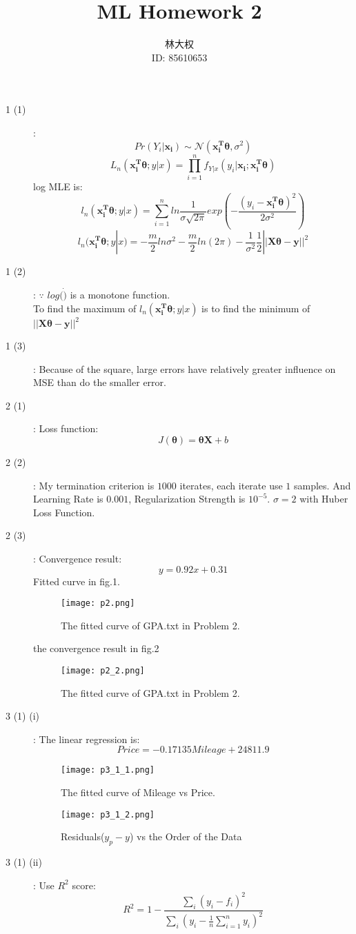 \documentclass[UTF8]{ctexart}
\title{ML Homework 2}
\author{林大权 \\ ID: 85610653}
\date{}
\begin{document}
\maketitle

\begin{description}
\item[1 (1)]: $$Pr(Y_i|\bm{x_i})\sim \mathcal{N}(\bm{x_i^T}\bm{\theta},\sigma ^ 2)$$
$$L_n(\bm{x_i^T}\bm{\theta};y|x) = \prod_{i=1}^{n}f_{Y|x}(y_i|\bm{x_i};\bm{x_i^T}\bm{\theta})$$
log MLE is:
$$l_n(\bm{x_i^T}\bm{\theta};y|x) = \sum_{i=1}^{n}ln\frac{1}{\sigma\sqrt{2\pi}}exp(-\frac{(y_i - \bm{x_i^T}\bm{\theta})^2}{2\sigma^2})$$
$$l_n(\bm{x_i^T}\bm{\theta};y|x) = -\frac{m}{2}ln\sigma^2 - \frac{m}{2}ln(2\pi)-\frac{1}{\sigma^2}\frac{1}{2}||\bm{X}\bm{\theta} - \bm{y}||^2$$
\item[1 (2)]: $\because$ $log(\dot)$ is a monotone function.\\ 
To find the maximum of $l_n(\bm{x_i^T}\bm{\theta};y|x)$ is to find the minimum of $||\bm{X}\bm{\theta} - \bm{y}||^2$

\item[1 (3)]: Because of the square, large errors have relatively greater influence on MSE than do the smaller error. 

\item[2 (1)]: Loss function:
$$J(\bm{\theta}) = \bm{\theta} \bm{X} + b $$
\item[2 (2)]: My termination criterion is $1000$ iterates, each iterate use $1$ samples. And Learning Rate is $0.001$, Regularization Strength is $10^{-5}$. $\sigma = 2$ with Huber Loss Function.
\item[2 (3)]: Convergence result:
$$y = 0.92x + 0.31$$
Fitted curve in fig.1.
\begin{figure}
\centering
        \texttt{[image: p2.png]}
    \caption{The fitted curve of GPA.txt in Problem 2.}
    \label{fig:verticalcell}
\end{figure}
the convergence result in fig.2
\begin{figure}
\centering
        \texttt{[image: p2\_2.png]}
    \caption{The fitted curve of GPA.txt in Problem 2.}
    \label{fig:verticalcell}
\end{figure}
\item[3 (1) (i)]: The linear regression is:
$$ Price = -0.17135Mileage + 24811.9$$
\begin{figure}
\centering
        \texttt{[image: p3\_1\_1.png]}
    \caption{The fitted curve of Mileage vs Price.}
    \label{fig:verticalcell}
\end{figure}
\begin{figure}
\centering
        \texttt{[image: p3\_1\_2.png]}
    \caption{Residuals($y_p - y$) vs the Order of the Data}
    \label{fig:verticalcell}
\end{figure}
\item[3 (1) (ii)]:
Use $R^2$ score:
$$R^2 = 1 - \frac{\sum_i(y_i-f_i)^2}{\sum_i(y_i - \frac{1}{n}\sum_{i=1}^{n}y_i)^2}$$


\end{description}
\end{document}
